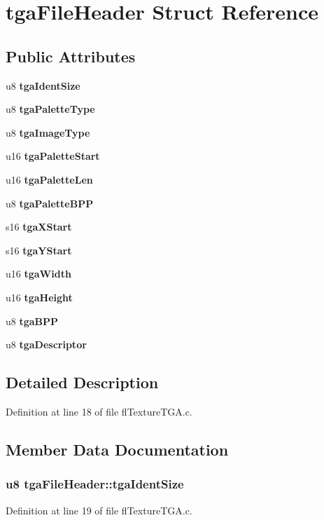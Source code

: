 \section{tga\-File\-Header Struct Reference}
\label{structtgaFileHeader}
\subsection*{Public Attributes}
\begin{CompactItemize}
\item 
u8 {\bf tga\-Ident\-Size}
\item 
u8 {\bf tga\-Palette\-Type}
\item 
u8 {\bf tga\-Image\-Type}
\item 
u16 {\bf tga\-Palette\-Start}
\item 
u16 {\bf tga\-Palette\-Len}
\item 
u8 {\bf tga\-Palette\-BPP}
\item 
s16 {\bf tga\-XStart}
\item 
s16 {\bf tga\-YStart}
\item 
u16 {\bf tga\-Width}
\item 
u16 {\bf tga\-Height}
\item 
u8 {\bf tga\-BPP}
\item 
u8 {\bf tga\-Descriptor}
\end{CompactItemize}


\subsection{Detailed Description}




Definition at line 18 of file fl\-Texture\-TGA.c.

\subsection{Member Data Documentation}
\subsubsection{\setlength{\rightskip}{0pt plus 5cm}u8 {\bf tga\-File\-Header::tga\-Ident\-Size}}\label{structtgaFileHeader_a5227bbe19d1af16b5bfdcd4bd0f6f35}




Definition at line 19 of file fl\-Texture\-TGA.c.

